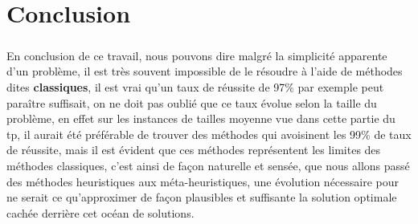 \chapter*{Conclusion}
\paragraph{}
En conclusion de ce travail, nous pouvons dire malgré la simplicité apparente d'un problème, il est très souvent impossible de le résoudre à l'aide de méthodes dites \textbf{classiques}, il est vrai qu'un taux de réussite de 97\% par exemple peut paraître suffisait, on ne doit pas oublié que ce taux évolue selon la taille du problème, en effet sur les instances de tailles moyenne vue dans cette partie du tp, il aurait été préférable de trouver des méthodes qui avoisinent les 99\% de taux de réussite, mais il est évident que ces méthodes représentent les limites des méthodes classiques, c'est ainsi de façon naturelle et sensée, que nous allons passé des méthodes heuristiques aux méta-heuristiques, une évolution nécessaire pour ne serait ce qu'approximer de façon plausibles et suffisante la solution optimale cachée derrière cet océan de solutions.